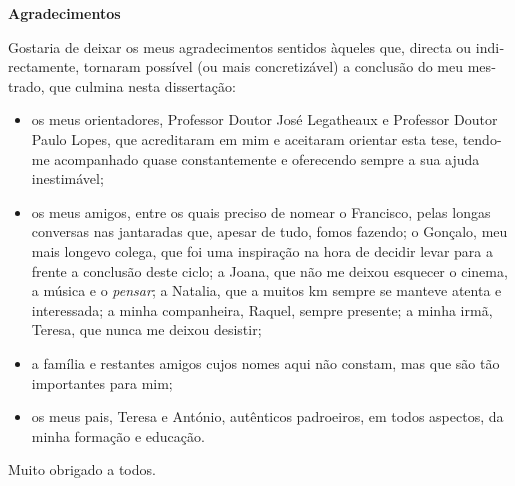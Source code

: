 
\cleardoublepage\thispagestyle{plain}

\begin{otherlanguage}{portuguese}
  \textbf{\Large Agradecimentos}

  Gostaria de deixar os meus agradecimentos sentidos àqueles que, directa ou indirectamente, tornaram possível (ou mais concretizável) a conclusão do meu mestrado, que culmina nesta dissertação:
  \begin{itemize}
    \item os meus orientadores, Professor Doutor José Legatheaux e Professor Doutor Paulo Lopes, que acreditaram em mim e aceitaram orientar esta tese, tendo-me acompanhado quase constantemente e oferecendo sempre a sua ajuda inestimável;
    \item os meus amigos, entre os quais preciso de nomear o Francisco, pelas longas conversas nas jantaradas que, apesar de tudo, fomos fazendo; o Gonçalo, meu mais longevo colega, que foi uma inspiração na hora de decidir levar para a frente a conclusão deste ciclo; a Joana, que não me deixou esquecer o cinema, a música e o \emph{pensar}; a Natalia, que a muitos km sempre se manteve atenta e interessada; a minha companheira, Raquel, sempre presente; a minha irmã, Teresa, que nunca me deixou desistir;
    \item a família e restantes amigos cujos nomes aqui não constam, mas que são tão importantes para mim;
    \item os meus pais, Teresa e António, autênticos padroeiros, em todos aspectos, da minha formação e educação.
  \end{itemize}

  Muito obrigado a todos.
\end{otherlanguage}
